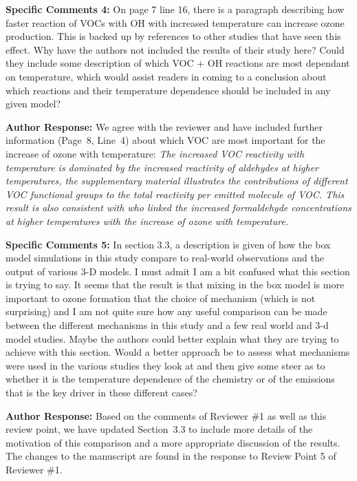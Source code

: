 \documentclass{article}
\begin{document}
\textbf{Specific Comments 4:} On page 7 line 16, there is a paragraph describing how faster reaction of VOCs with OH with increased temperature can increase ozone production. This is backed up by references to other studies that have seen this effect. Why have the authors not included the results of their study here? Could they include some description of which VOC + OH reactions are most dependant on temperature, which would assist readers in coming to a conclusion about which reactions and their temperature dependence should be included in any given model?

\textbf{Author Response:} We agree with the reviewer and have included further information (Page~8, Line~4) about which VOC are most important for the increase of ozone with temperature:
\textit{
The increased VOC reactivity with temperature is dominated by the increased reactivity of aldehydes at higher temperatures, the supplementary material illustrates the contributions of different VOC functional groups to the total reactivity per emitted molecule of VOC.
This result is also consistent with \citet{Steiner:2006} who linked the increased formaldehyde concentrations at higher temperatures with the increase of ozone with temperature.
}

\textbf{Specific Comments 5:} In section 3.3, a description is given of how the box model simulations in this study compare to real-world observations and the output of various 3-D models. I must admit I am a bit confused what this section is trying to say. It seems that the result is that mixing in the box model is more important to ozone formation that the choice of mechanism (which is not surprising) and I am not quite sure how any useful comparison can be made between the different mechanisms in this study and a few real world and 3-d model studies. Maybe the authors could better explain what they are trying to achieve with this section. Would a better approach be to assess what mechanisms were used in the various studies they look at and then give some steer as to whether it is the temperature dependence of the chemistry or of the emissions that is the key driver in these different cases?

\textbf{Author Response:} Based on the comments of Reviewer \#1 as well as this review point, we have updated Section~3.3 to include more details of the motivation of this comparison and a more appropriate discussion of the results. The changes to the manuscript are found in the response to Review Point 5 of Reviewer \#1.
\end{document}
